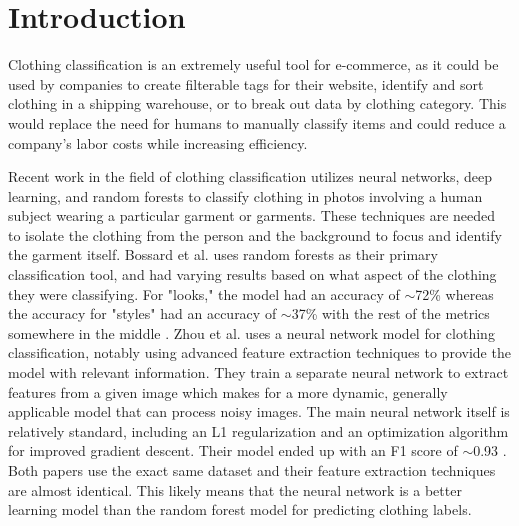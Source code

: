 
\section{Introduction}
\label{sec:intro}

 Clothing classification is an extremely useful tool for e-commerce, as it could be used by companies to create filterable tags for their website, identify and sort clothing in a shipping warehouse, or to break out data by clothing category. This would replace the need for humans to manually classify items and could reduce a company's labor costs while increasing efficiency.

Recent work in the field of clothing classification utilizes neural networks, deep learning, and random forests to classify clothing in photos involving a human subject wearing a particular garment or garments. These techniques are needed to isolate the clothing from the person and the background to focus and identify the garment itself. Bossard et al. uses random forests as their primary classification tool, and had varying results based on what aspect of the clothing they were classifying. For "looks," the model had an accuracy of $\sim$72\% whereas the accuracy for "styles" had an accuracy of $\sim$37\% with the rest of the metrics somewhere in the middle \cite{eth_biwi_00974}. Zhou et al. uses a neural network model for clothing classification, notably using advanced feature extraction techniques to provide the model with relevant information. They train a separate neural network to extract features from a given image which makes for a more dynamic, generally applicable model that can process noisy images. The main neural network itself is relatively standard, including an L1 regularization and an optimization algorithm for improved gradient descent. Their model ended up with an F1 score of $\sim$0.93 \cite{Zhou}. Both papers use the exact same dataset and their feature extraction techniques are almost identical. This likely means that the neural network is a better learning model than the random forest model for predicting clothing labels.






